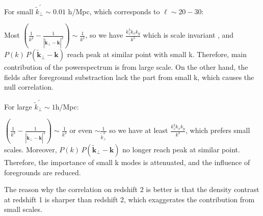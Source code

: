     For small $\tilde{k}_\perp^\prime \sim 0.01$ h/Mpc, 
    which corresponds to $\ell \sim 20-30$:
    
  Most $ (\frac{1}{k^2}-\frac{1}{|\tilde{\bm{k}}_\perp-\bm{k}|^2})
   \sim \frac{1}{k^3}$, 
   so we have $\frac{k_z^3k_xk_y}{k^5}$ which is scale invariant
   , and 
   $ P(k)\,P(\tilde{\bm{k}}_\perp-\bm{k})$
   reach peak at similar point with small k. 
   Therefore, main contribution of the powerspectrum is from large scale.
On the other hand, the fields after foreground substraction lack the part from small k, which causes the null correlation.

For large $\tilde{k}_\perp^\prime\sim 1$h/Mpc:

   $ (\frac{1}{k^2}-\frac{1}{|\tilde{\bm{k}}_\perp-\bm{k}|^2})
   \sim \frac{1}{k^2}$ or even $\sim \frac{1}{\tilde{k}_\perp^2}$
   so we have at least $\frac{k_z^3k_xk_y}{k^4}$, which prefers small scales.
   Moreover, $ P(k)\,P(\tilde{\bm{k}}_\perp-\bm{k})$
   no longer reach peak at similar point. 
Therefore, the importance of small k modes is attenuated, 
and the influence of foregrounds are reduced.

The reason why the correlation on redshift 2 is better is that 
the density contrast at redshift 1 is sharper than redshift 2, 
which exaggerates the contribution from small scales.
